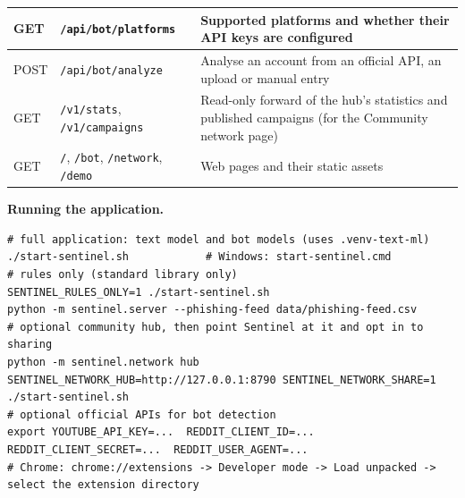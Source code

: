\begin{table}[H]
\begin{tabular}{|l|l|>{\raggedright\arraybackslash}p{8.6cm}|}
GET & \texttt{/api/bot/platforms} & Supported platforms and whether their API keys are configured \\ \hline
POST & \texttt{/api/bot/analyze} & Analyse an account from an official API, an upload or manual entry \\ \hline
GET & \texttt{/v1/stats}, \texttt{/v1/campaigns} & Read-only forward of the hub's statistics and published campaigns (for the Community network page) \\ \hline
GET & \texttt{/}, \texttt{/bot}, \texttt{/network}, \texttt{/demo} & Web pages and their static assets \\ \hline
\end{tabular}
\end{table}

\noindent\textbf{Running the application.}
\begin{lstlisting}[style=json]
# full application: text model and bot models (uses .venv-text-ml)
./start-sentinel.sh            # Windows: start-sentinel.cmd
# rules only (standard library only)
SENTINEL_RULES_ONLY=1 ./start-sentinel.sh
python -m sentinel.server --phishing-feed data/phishing-feed.csv
# optional community hub, then point Sentinel at it and opt in to sharing
python -m sentinel.network hub
SENTINEL_NETWORK_HUB=http://127.0.0.1:8790 SENTINEL_NETWORK_SHARE=1 ./start-sentinel.sh
# optional official APIs for bot detection
export YOUTUBE_API_KEY=...  REDDIT_CLIENT_ID=...  REDDIT_CLIENT_SECRET=...  REDDIT_USER_AGENT=...
# Chrome: chrome://extensions -> Developer mode -> Load unpacked -> select the extension directory
\end{lstlisting}

